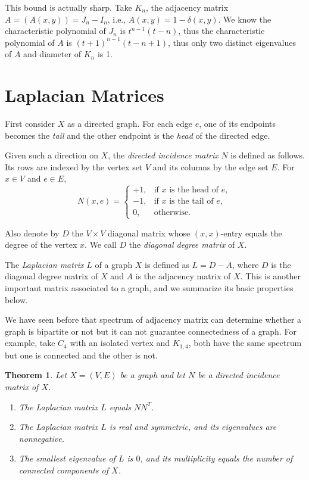 \documentclass{amsart}
\theoremstyle{plain}
\newtheorem{theorem}{Theorem}[section]
\begin{document}
This bound is actually sharp. Take $K_n$, the adjacency matrix $A = (A(x,y)) = J_n - I_n$, i.e., $A(x,y) = 1 - \delta(x,y)$. We know the characteristic polynomial of $J_n$ is $t^{n-1}(t-n)$, thus the characteristic polynomial of $A$ is $(t+1)^{n-1}(t - n+1)$, thus only two distinct eigenvalues of $A$ and diameter of $K_n$ is 1.


\section{Laplacian Matrices}

First consider $X$ as a directed graph. For each edge $e$, one of its endpoints becomes the \emph{tail} and the other endpoint is the \emph{head} of the directed edge.

Given such a direction on $X$, the \emph{directed incidence matrix} $N$ is defined 
as follows. Its rows are indexed by the vertex set $V$ and its columns by the edge 
set $E$. For $x \in V$ and $e \in E$,
\[
N(x,e) =
\begin{cases}
+1, & \text{if $x$ is the head of $e$}, \\
-1, & \text{if $x$ is the tail of $e$}, \\
0, & \text{otherwise}.
\end{cases}
\]

Also denote by $D$ the $V \times V$ diagonal matrix whose $(x,x)$-entry equals 
the degree of the vertex $x$. We call $D$ the \emph{diagonal degree matrix} of $X$. 

 The \emph{Laplacian matrix} $L$ of a graph $X$ is defined as $L = D - A$, where 
$D$ is the diagonal degree matrix of $X$ and $A$ is the adjacency matrix of $X$. 
This is another important matrix associated to a graph, and we summarize its basic 
properties below.

We have seen before that spectrum of adjacency matrix can determine whether a graph is bipartite or not but it can not guarantee connectedness of a graph. For example, take $C_4$ with an isolated vertex and $K_{1,4}$, both have the same spectrum but one is connected and the other is not.

\begin{theorem}
Let $X = (V, E)$ be a graph and let $N$ be a directed incidence matrix of $X$.
\begin{enumerate}
\item The Laplacian matrix $L$ equals $NN^T$.
\item The Laplacian matrix $L$ is real and symmetric, and its eigenvalues are nonnegative.
\item The smallest eigenvalue of $L$ is $0$, and its multiplicity equals the number of connected components of $X$.
\end{enumerate}
\end{theorem}
\end{document}
